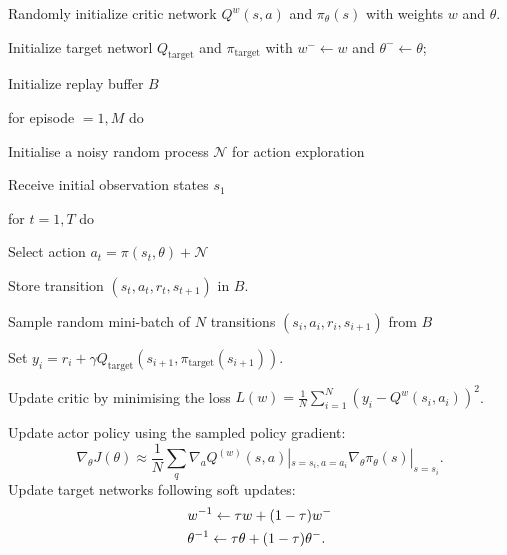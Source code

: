 \documentclass[11pt,a4paper]{article}
\def\N{{\mathcal N}}
\begin{document}
\begin{tcolorbox}[title=DDPG algorithm]
Randomly initialize critic network $Q^w(s,a)$ and $\pi_{\theta}(s)$ with weights $w$ and $\theta$.\par 
Initialize target networl $Q_{\mathrm{target}}$ and $\pi_{\mathrm{target}}$ with $w^{-} \leftarrow w$ and $\theta^{-} \leftarrow \theta$; \par 
Initialize replay buffer $B$ \par 
for episode $=1,M$ do \par 
\hspace{1cm} Initialise a noisy random process $\N$ for action exploration \par 
\hspace{1cm} Receive initial observation states $s_1$ \par 
\hspace{1cm} for $t=1, T$ do \par 
\hspace{2cm} Select action $a_t = \pi(s_t,\theta) +\N$ \par 
\hspace{2cm} Store transition $(s_t,a_t,r_t,s_{t+1})$ in $B$. \par 
\hspace{2cm} Sample random mini-batch of $N$ transitions $(s_i,a_i,r_i,s_{i+1})$ from $B$ \par 
\hspace{2cm} Set $y_i = r_i + \gamma Q_{\mathrm{target}}(s_{i+1}, \pi_{\mathrm{target}}(s_{i+1}))$. \par 
\hspace{2cm} Update critic by minimising the loss $L(w) = \frac{1}{N}\sum_{i=1}^N(y_i -Q^w(s_i,a_i))^2$. \par 
\hspace{2cm} Update actor policy using the sampled policy gradient:
\begin{equation*}
\nabla_{\theta} J(\theta) \approx \frac{1}{N}\sum_q \nabla_a Q^(w)(s,a)|_{s=s_i,a=a_i}\nabla_{\theta}\pi_{\theta}(s)|_{s=s_i}.
\end{equation*}
\hspace{2cm} Update target networks following soft updates:
\begin{equation*}
\aligned 
& w^{-1} \leftarrow \tau w + (1-\tau) w^{-} \\ 
& \theta^{-1} \leftarrow \tau \theta + (1-\tau) \theta^{-}.
\endaligned
\end{equation*}
\end{tcolorbox}
\end{document}
